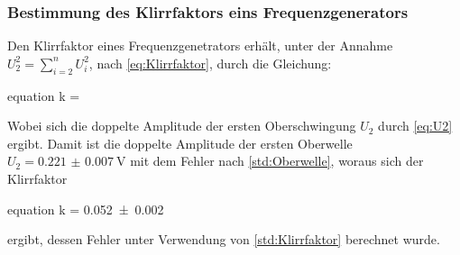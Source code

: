 \subsubsection{Bestimmung des Klirrfaktors eins Frequenzgenerators}
\label{sec:Auswertung_Klirrfaktor} 
	
	Den Klirrfaktor eines Frequenzgenetrators erhält, unter der Annahme $\displaystyle U_{2}^{2} = \sum_{i=2}^{n} U_{i}^{2}$,
	nach \cref{eq:Klirrfaktor}, durch die Gleichung:
	\begin{empheq}{equation}
		k = 
		\label{eq:Klirrfaktor2}
	\end{empheq}     
	
	Wobei sich die doppelte Amplitude der ersten Oberschwingung $U_{2}$ durch \cref{eq:U2} ergibt.
    Damit ist die doppelte Amplitude der ersten Oberwelle $U_{2} = \SI{0.221(7)}{\volt}$ mit dem Fehler nach \cref{std:Oberwelle},
	woraus sich der Klirrfaktor
	\begin{empheq}{equation}
		\label{eq:Klirrfaktor_Wert}
		k = \num{0.052(2)}
	\end{empheq}	
	ergibt, dessen Fehler unter Verwendung von \cref{std:Klirrfaktor} berechnet wurde.